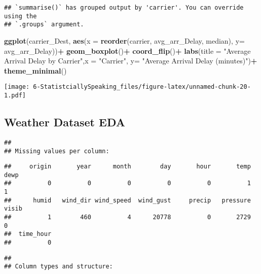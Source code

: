 \documentclass[
]{article}
\newenvironment{Shaded}{\begin{snugshade}}{\end{snugshade}}
\newcommand{\AttributeTok}[1]{\textcolor[rgb]{0.13,0.29,0.53}{#1}}
\newcommand{\FunctionTok}[1]{\textcolor[rgb]{0.13,0.29,0.53}{\textbf{#1}}}
\newcommand{\NormalTok}[1]{#1}
\newcommand{\SpecialCharTok}[1]{\textcolor[rgb]{0.81,0.36,0.00}{\textbf{#1}}}
\newcommand{\StringTok}[1]{\textcolor[rgb]{0.31,0.60,0.02}{#1}}
\begin{document}
\begin{verbatim}
## `summarise()` has grouped output by 'carrier'. You can override using the
## `.groups` argument.
\end{verbatim}

\begin{Shaded}
\begin{Highlighting}[]
  \FunctionTok{ggplot}\NormalTok{(carrier\_Dest, }\FunctionTok{aes}\NormalTok{(}\AttributeTok{x =} \FunctionTok{reorder}\NormalTok{(carrier, avg\_arr\_Delay, median), }\AttributeTok{y=}\NormalTok{ avg\_arr\_Delay))}\SpecialCharTok{+}
  \FunctionTok{geom\_boxplot}\NormalTok{()}\SpecialCharTok{+}
  \FunctionTok{coord\_flip}\NormalTok{()}\SpecialCharTok{+}
  \FunctionTok{labs}\NormalTok{(}\AttributeTok{title =} \StringTok{"Average Arrival Delay by Carrier"}\NormalTok{,}\AttributeTok{x =} \StringTok{"Carrier"}\NormalTok{, }\AttributeTok{y=} \StringTok{"Average Arrival Delay (minutes)"}\NormalTok{)}\SpecialCharTok{+}
  \FunctionTok{theme\_minimal}\NormalTok{()}
\end{Highlighting}
\end{Shaded}

\texttt{[image: 6-StatistciallySpeaking\_files/figure-latex/unnamed-chunk-20-1.pdf]}

\subsection{Weather Dataset EDA}\label{weather-dataset-eda}

\begin{verbatim}
## 
## Missing values per column:
\end{verbatim}

\begin{verbatim}
##     origin       year      month        day       hour       temp       dewp 
##          0          0          0          0          0          1          1 
##      humid   wind_dir wind_speed  wind_gust     precip   pressure      visib 
##          1        460          4      20778          0       2729          0 
##  time_hour 
##          0
\end{verbatim}

\begin{verbatim}
## 
## Column types and structure:
\end{verbatim}
\end{document}
